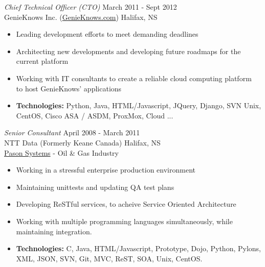 \documentclass[line,margin]{res}
\begin{document}
\begin{resume}
    {\sl Chief Technical Officer (CTO)} \hfill March 2011 - Sept 2012 \\
    GenieKnows Inc. (\href{http://www.genieknows.com}{GenieKnows.com}) \hfill Halifax, NS \smallskip
    \begin{itemize}  \itemsep -2pt %
     \item Leading development efforts to meet demanding deadlines
     \item Architecting new developments and developing future roadmaps for the \\
     current platform
     \item Working with IT consultants to create a reliable cloud computing platform \\ to host GenieKnows' applications
     \item {\bf Technologies:} \hspace{1pt}
        Python, Java, HTML/Javascript, JQuery, Django, SVN \newline
        \hspace*{72pt} Unix, CentOS, Cisco ASA / ASDM, ProxMox, Cloud ...
    \end{itemize}

   {\sl Senior Consultant} \hfill April 2008 - March 2011 \\
    NTT Data (Formerly Keane Canada) \hfill Halifax, NS \\
    \href{http://www.pason.com/}{Pason Systems} - Oil {\&} Gas Industry \smallskip
    \begin{itemize}  \itemsep -2pt %
     \item Working in a stressful enterprise production environment
     \item Maintaining unittests and updating QA test plans
     \item Developing ReSTful services, to acheive Service Oriented Architecture
     \item Working with multiple programming languages
            simultaneously, while \\ maintaining integration.
     \item {\bf Technologies:} \hspace{1pt}
        C, Java, HTML/Javascript, Prototype, Dojo, Python, Pylons, \newline
        \hspace*{72pt} XML, JSON, SVN, Git, MVC, ReST, SOA, Unix, CentOS.
    \end{itemize}


\end{resume}
\end{document}
